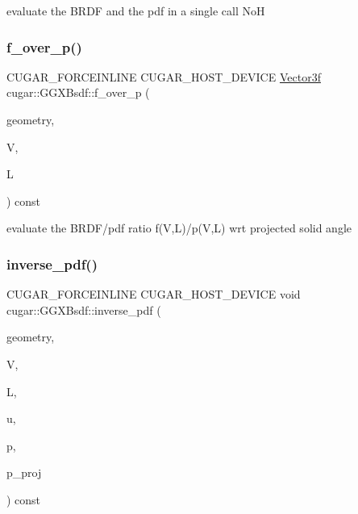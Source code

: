 evaluate the B\+R\+DF and the pdf in a single call NoH \mbox{\label{structcugar_1_1_g_g_x_bsdf_a143ff030d5661b546a099a7273e569d3}} 
\subsubsection{\texorpdfstring{f\+\_\+over\+\_\+p()}{f\_over\_p()}}
{\footnotesize\ttfamily C\+U\+G\+A\+R\+\_\+\+F\+O\+R\+C\+E\+I\+N\+L\+I\+NE C\+U\+G\+A\+R\+\_\+\+H\+O\+S\+T\+\_\+\+D\+E\+V\+I\+CE \hyperlink{structcugar_1_1_vector}{Vector3f} cugar\+::\+G\+G\+X\+Bsdf\+::f\+\_\+over\+\_\+p (\begin{DoxyParamCaption}\item[{const \hyperlink{structcugar_1_1_differential_geometry}{Differential\+Geometry} \&}]{geometry,  }\item[{const \hyperlink{structcugar_1_1_vector}{Vector3f}}]{V,  }\item[{const \hyperlink{structcugar_1_1_vector}{Vector3f}}]{L }\end{DoxyParamCaption}) const\hspace{0.3cm}{\ttfamily [inline]}}

evaluate the B\+R\+D\+F/pdf ratio f(\+V,\+L)/p(V,L) wrt projected solid angle \mbox{\label{structcugar_1_1_g_g_x_bsdf_a340206c9ac0de4146ed789d3a27b09af}} 
\subsubsection{\texorpdfstring{inverse\+\_\+pdf()}{inverse\_pdf()}}
{\footnotesize\ttfamily C\+U\+G\+A\+R\+\_\+\+F\+O\+R\+C\+E\+I\+N\+L\+I\+NE C\+U\+G\+A\+R\+\_\+\+H\+O\+S\+T\+\_\+\+D\+E\+V\+I\+CE void cugar\+::\+G\+G\+X\+Bsdf\+::inverse\+\_\+pdf (\begin{DoxyParamCaption}\item[{const \hyperlink{structcugar_1_1_differential_geometry}{Differential\+Geometry} \&}]{geometry,  }\item[{const \hyperlink{structcugar_1_1_vector}{Vector3f}}]{V,  }\item[{const \hyperlink{structcugar_1_1_vector}{Vector3f}}]{L,  }\item[{const \hyperlink{structcugar_1_1_vector}{Vector3f}}]{u,  }\item[{float \&}]{p,  }\item[{float \&}]{p\+\_\+proj }\end{DoxyParamCaption}) const\hspace{0.3cm}{\ttfamily [inline]}}

